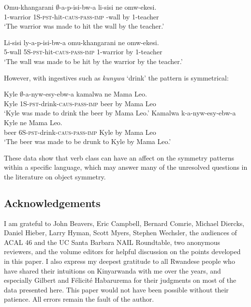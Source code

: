 \documentclass[output=paper]{langsci/langscibook}
\begin{document}
  
 \begin{exe}
%
\ex\label{anything2}
\begin{xlist}
\ex\gll Omu-khangarani $\emptyset$-a-p-isi-bw-a li-sisi ne omw-ekesi.\\
	{\scshape 1-}warrior {\scshape 1S-pst-}hit-{\scshape caus-pass-imp} {-}wall by {\scshape 1}-teacher\\
	\glt `The warrior was made to hit the wall by the teacher.'

\ex \gll {\bad}Li-sisi ly-a-p-isi-bw-a omu-khangarani ne omw-ekesi.\\
		{\scshape 5}-wall {\scshape 5S-pst}-hit-{\scshape caus-pass-imp} {\scshape 1-}warrior by {\scshape 1-}teacher\\
		\glt `The wall was made to be hit by the warrior by the teacher.'
		

\end{xlist}
\end{exe}
%
 However, with ingestives such as \emph{kunywa} `drink' the pattern is
symmetrical:
%
\begin{exe}
\ex\label{beer}\begin{xlist}
\ex\gll Kyle $\emptyset$-a-nyw-esy-ebw-a kamalwa ne Mama Leo.\\
		Kyle {\scshape 1S-pst-}drink-{\scshape caus-pass-imp} beer by Mama Leo\\
		\glt `Kyle was made to drink the beer by Mama Leo.'
\ex\gll Kamalwa k-a-nyw-esy-ebw-a Kyle ne Mama Leo.\\
			beer {\scshape 6S-pst-}drink-{\scshape caus-pass-imp} Kyle by Mama Leo\\
			\glt `The beer was made to be drunk to Kyle by Mama Leo.'
\end{xlist}
\end{exe}

 These data show that verb class can have an affect on the symmetry patterns within a specific language, which may answer many of the unresolved questions in the literature on object symmetry. 

\fi
  

 
 
\iffalse 
appl constraint: 
if $\beta$ is the sum of the lexical entailments of the arguments \{x_1 ... x_n\} of a verb, and $\phi$ = $\alpha$($\beta$), $\phi$ = 1 iff $\phi \noteq \beta$ and 
\fi 



\subsection*{Acknowledgements}
I am grateful to John Beavers, Eric Campbell, Bernard Comrie, Michael Diercks, Daniel Hieber, Larry Hyman, Scott Myers, Stephen Wechsler, the audiences of ACAL 46 and the UC Santa Barbara NAIL Roundtable, two anonymous reviewers, and the volume editors for helpful discussion on the points developed in this paper. I also express my deepest gratitude to all Rwandese people who have shared their intuitions on Kinyarwanda with me over the years, and especially Gilbert and Félicité Habarurema for their judgments on most of the data presented here. This paper would not have been possible without their patience. All errors remain the fault of the author.
\end{document}
